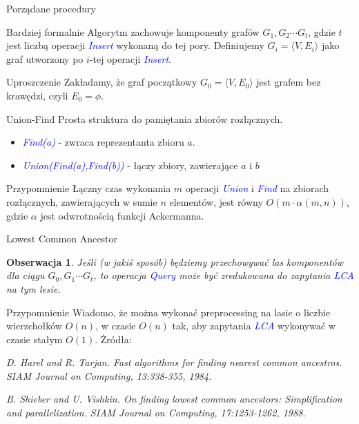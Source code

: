 \documentclass{beamer}
\newtheorem{obs}{Obserwacja}
\newcommand{\emp}[1]{\textcolor{blue}{\textit{#1}}}
\newcommand{\tuple}[2]{\langle #1 , #2 \rangle}
\begin{document}
\begin{frame}{Porządane procedury}
\begin{block}{Bardziej formalnie}
Algorytm zachowuje komponenty grafów $G_1,G_2 \cdots G_t$, gdzie $t$ jest liczbą operacji \emp{Insert} wykonaną do tej pory. Definiujemy $G_i=\tuple{V}{E_i}$ jako graf utworzony po $i$-tej operacji \emp{Insert}.
\end{block}

\begin{block}{Uproszczenie}
Zakładamy, że graf początkowy $G_0=\tuple{V}{E_0}$ jest grafem bez krawędzi, czyli $E_0 = \phi$. 
\end{block}
\end{frame}

\begin{frame}{Union-Find}
Prosta struktura do pamiętania zbiorów rozłącznych.
\begin{itemize}
\item \emp{Find(a)} - zwraca reprezentanta zbioru $a$. 
\item \emp{Union(Find(a),Find(b))} - łączy zbiory, zawierające $a$ i $b$
\end{itemize}
\begin{block}{Przypomnienie}
Łączny czas wykonania $m$ operacji \emp{Union} i \emp{Find} na zbiorach rozłącznych, zawierających w sumie $n$ elementów, jest równy $O(m\cdot\alpha(m,n))$, gdzie $\alpha$ jest odwrotnością funkcji Ackermanna.
\end{block}
\end{frame}

\begin{frame}{Lowest Common Ancestor}
\begin{obs}
Jeśli (w jakiś sposób) będziemy przechowywać las komponentów dla ciągu $G_0,G_1 \cdots G_t$, to operacja \emp{Query} może być zredukowana do zapytania \emp{LCA} na tym lesie.
\end{obs}

\begin{block}{Przypomnienie}
Wiadomo, że można wykonać preprocessing na lasie o liczbie wierzchołków \alert{$O(n)$}, w czasie \alert{$O(n)$} tak, aby zapytania \emp{LCA} wykonywać w czasie stałym \alert{$O(1)$}. Żródła:

\vspace{0.1cm}
{\small\textit{D. Harel and R. Tarjan. Fast algorithms for finding nearest common ancestros. SIAM Journal on Computing, 13:338-355, 1984.}}

\vspace{0.1cm}
{\small\textit{B. Shieber and U. Vishkin. On finding lowest common ancestors: Simplification and parallelization. SIAM Journal on Computing, 17:1253-1262, 1988.}}
\end{block}
\end{frame}
\end{document}

